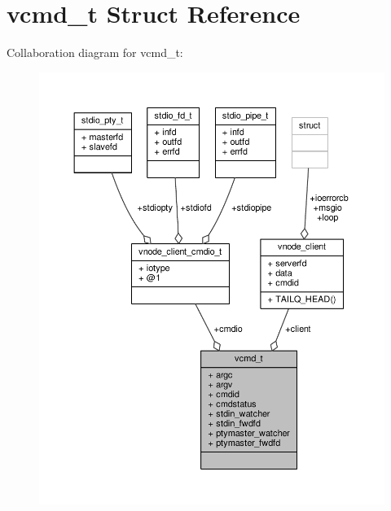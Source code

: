 \hypertarget{structvcmd__t}{\section{vcmd\+\_\+t Struct Reference}
\label{structvcmd__t}
}


Collaboration diagram for vcmd\+\_\+t\+:
\nopagebreak
\begin{figure}[H]
\begin{center}
\leavevmode
\includegraphics[width=350pt]{structvcmd__t__coll__graph}
\end{center}
\end{figure}
